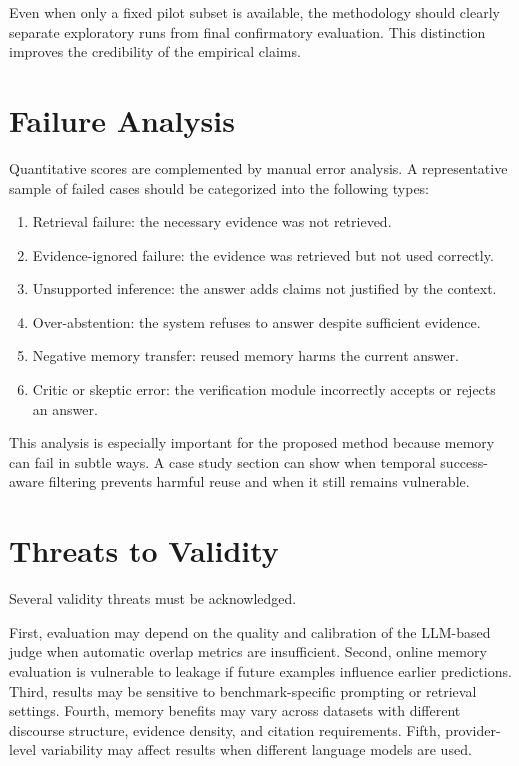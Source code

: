 Even when only a fixed pilot subset is available, the methodology should clearly separate exploratory runs from final confirmatory evaluation. This distinction improves the credibility of the empirical claims.

\section{Failure Analysis}
\label{sec:methodology-failure-analysis}

Quantitative scores are complemented by manual error analysis. A representative sample of failed cases should be categorized into the following types:

\begin{enumerate}[leftmargin=*]
\item Retrieval failure: the necessary evidence was not retrieved.
\item Evidence-ignored failure: the evidence was retrieved but not used correctly.
\item Unsupported inference: the answer adds claims not justified by the context.
\item Over-abstention: the system refuses to answer despite sufficient evidence.
\item Negative memory transfer: reused memory harms the current answer.
\item Critic or skeptic error: the verification module incorrectly accepts or rejects an answer.
\end{enumerate}

This analysis is especially important for the proposed method because memory can fail in subtle ways. A case study section can show when temporal success-aware filtering prevents harmful reuse and when it still remains vulnerable.

\section{Threats to Validity}
\label{sec:methodology-validity}

Several validity threats must be acknowledged.

First, evaluation may depend on the quality and calibration of the LLM-based judge when automatic overlap metrics are insufficient. Second, online memory evaluation is vulnerable to leakage if future examples influence earlier predictions. Third, results may be sensitive to benchmark-specific prompting or retrieval settings. Fourth, memory benefits may vary across datasets with different discourse structure, evidence density, and citation requirements. Fifth, provider-level variability may affect results when different language models are used.

